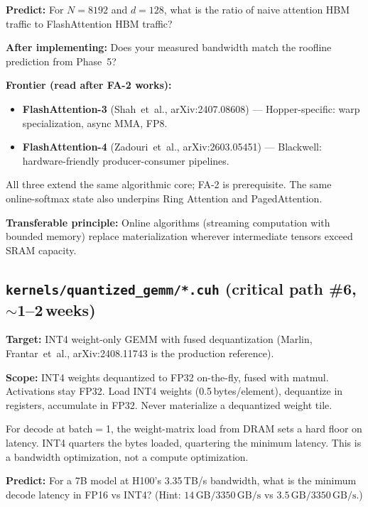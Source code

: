 \documentclass[11pt, letterpaper]{article}
\begin{document}
\begin{stepbox}
\textbf{Predict:} For $N = 8192$ and $d = 128$, what is the ratio of naive attention HBM traffic to FlashAttention HBM traffic?

\textbf{After implementing:} Does your measured bandwidth match the roofline prediction from Phase~5?
\end{stepbox}

\textbf{Frontier (read after FA-2 works):}
\begin{itemize}
\item \textbf{FlashAttention-3} (Shah~et~al., arXiv:2407.08608) --- Hopper-specific: warp specialization, async MMA, FP8.
\item \textbf{FlashAttention-4} (Zadouri~et~al., arXiv:2603.05451) --- Blackwell: hardware-friendly producer-consumer pipelines.
\end{itemize}
All three extend the same algorithmic core; FA-2 is prerequisite. The same online-softmax state also underpins Ring Attention and PagedAttention.

\textbf{Transferable principle:} Online algorithms (streaming computation with bounded memory) replace materialization wherever intermediate tensors exceed SRAM capacity.

\subsection{\texttt{kernels/quantized\_gemm/*.cuh} (critical path \#6, $\sim$1--2\,weeks)}

\textbf{Target:} INT4 weight-only GEMM with fused dequantization (Marlin, Frantar~et~al., arXiv:2408.11743 is the production reference).

\textbf{Scope:} INT4 weights dequantized to FP32 on-the-fly, fused with matmul. Activations stay FP32. Load INT4 weights (0.5\,bytes/element), dequantize in registers, accumulate in FP32. Never materialize a dequantized weight tile.

For decode at batch$=$1, the weight-matrix load from DRAM sets a hard floor on latency. INT4 quarters the bytes loaded, quartering the minimum latency. This is a bandwidth optimization, not a compute optimization.

\begin{stepbox}
\textbf{Predict:} For a 7B model at H100's 3.35\,TB/s bandwidth, what is the minimum decode latency in FP16 vs INT4? (Hint: $14\,\text{GB} / 3350\,\text{GB/s}$ vs $3.5\,\text{GB} / 3350\,\text{GB/s}$.)
\end{stepbox}
\end{document}
